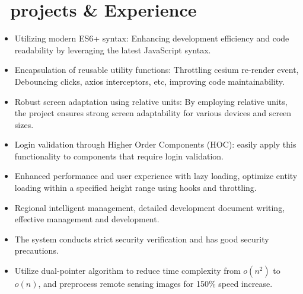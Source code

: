 \documentclass{resume}
\begin{document}
\section{\faUsers\ projects \& Experience}
\begin{itemize}
  \item Utilizing modern ES6+ syntax: Enhancing development efficiency and code readability by leveraging the latest JavaScript syntax.
  \item Encapsulation of reusable utility functions: Throttling cesium re-render event, Debouncing clicks, axios interceptors, etc, improving code maintainability.
  \item Robust screen adaptation using relative units: By employing relative units, the project ensures strong screen adaptability for various devices and screen sizes.
  \item Login validation through Higher Order Components (HOC): easily apply this functionality to components that require login validation.
  \item Enhanced performance and user experience with lazy loading, optimize entity loading within a specified height range using hooks and throttling.
\end{itemize}

\begin{itemize}
  \item Regional intelligent management, detailed development document writing, effective management and development.
  \item The system conducts strict security verification and has good security precautions.
  \item Utilize dual-pointer algorithm to reduce time complexity from \(\mathbf{\mathit{o(n^{2})}}\) to \(\mathbf{\mathit{o(n)}}\), and preprocess remote sensing images for 150\% speed increase.
\end{itemize}
\end{document}
